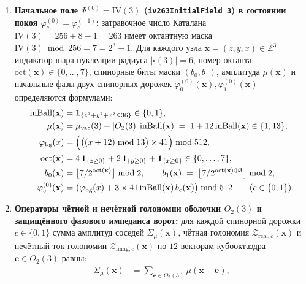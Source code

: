 \begin{enumerate}[label=\textbf{\arabic*.},leftmargin=*]
\item \textbf{Начальное поле $\Psi^{(0)} = \mathrm{IV}(3)$ (\texttt{iv263InitialField 3}) в состоянии покоя $\varphi_c^{(0)} = \varphi_c^{(-1)}$:}
  затравочное число Каталана $\mathrm{IV}(3) = 256 + 8 - 1 = 263$ имеет октантную маска $\mathrm{IV}(3) \bmod 256 = 7 = 2^3 - 1$. Для каждого узла $\mathbf{x} = (z, y, x) \in \mathbb{Z}^3$ индикатор шара нуклеации радиуса $|\square(3)| = 6$, номер октанта $\mathrm{oct}(\mathbf{x}) \in \{0,\dots,7\}$, спинорные биты маски $(b_0, b_1)$, амплитуда $\mu(\mathbf{x})$ и начальные фазы двух спинорных дорожек $\varphi_0^{(0)}(\mathbf{x}), \varphi_1^{(0)}(\mathbf{x})$ определяются формулами:
  \begin{align}
    \mathrm{inBall}(\mathbf{x}) &= \mathbf{1}_{\{z^2 + y^2 + x^2 \le 36\}} \in \{0, 1\}, \label{eq:mono-iv263-inball} \\
    \mu(\mathbf{x}) &= \mu_{\mathrm{vac}}(3) + |O_2(3)|\,\mathrm{inBall}(\mathbf{x}) \;=\; 1 + 12\,\mathrm{inBall}(\mathbf{x}) \in \{1, 13\}, \label{eq:mono-iv263-mu} \\
    \varphi_{\mathrm{bg}}(x) &= \Bigl(\bigl((x + 12) \bmod 13\bigr) \times 41\Bigr) \bmod 512, \label{eq:mono-iv263-bg} \\
    \mathrm{oct}(\mathbf{x}) &= 4\,\mathbf{1}_{\{z \ge 0\}} + 2\,\mathbf{1}_{\{y \ge 0\}} + \mathbf{1}_{\{x \ge 0\}} \in \{0, \dots, 7\}, \label{eq:mono-iv263-oct} \\
    b_0(\mathbf{x}) &= \bigl\lfloor 7 / 2^{\mathrm{oct}(\mathbf{x})} \bigr\rfloor \bmod 2, \qquad
    b_1(\mathbf{x}) \;=\; \bigl\lfloor 7 / 2^{\mathrm{oct}(\mathbf{x}) \oplus 3} \bigr\rfloor \bmod 2, \label{eq:mono-iv263-bits} \\
    \varphi_c^{(0)}(\mathbf{x}) &= \bigl(\varphi_{\mathrm{bg}}(x) + 3 \times 41\,\mathrm{inBall}(\mathbf{x})\,b_c(\mathbf{x})\bigr) \bmod 512 \qquad (c \in \{0, 1\}). \label{eq:mono-iv263-phi0}
  \end{align}
\item \textbf{Операторы чётной и нечётной голономии оболочки $O_2(3)$ и защищённого фазового импеданса ворот:}
  для каждой спинорной дорожки $c \in \{0, 1\}$ сумма амплитуд соседей $\Sigma_\mu(\mathbf{x})$, чётная голономия $\mathcal{Z}_{\mathrm{real},c}(\mathbf{x})$ и нечётный ток голономии $\mathcal{Z}_{\mathrm{imag},c}(\mathbf{x})$ по $12$ векторам кубооктаэдра $\mathbf{e} \in O_2(3)$ равны:
  \begin{align}
    \Sigma_\mu(\mathbf{x}) &= \sum_{\mathbf{e} \in O_2(3)} \mu(\mathbf{x} - \mathbf{e}), \label{eq:mono-field-summu} \\

\end{align}
\end{enumerate}
